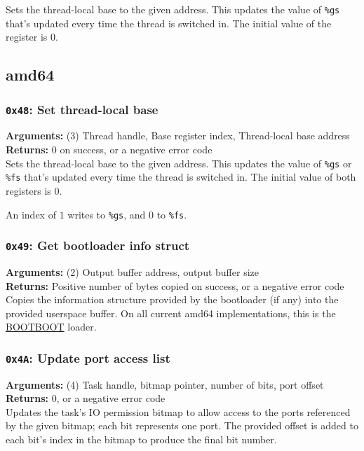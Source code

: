 \documentclass[11pt]{article}
\begin{document}
Sets the thread-local base to the given address. This updates the value of \texttt{\%gs} that's updated every time the thread is switched in. The initial value of the register is 0.

\subsection{amd64}

\subsubsection{{\tt 0x48}: Set thread-local base}
\textbf{Arguments:} (3) Thread handle, Base register index, Thread-local base address \\
\textbf{Returns:} 0 on success, or a negative error code \\

Sets the thread-local base to the given address. This updates the value of \texttt{\%gs} or \texttt{\%fs} that's updated every time the thread is switched in. The initial value of both registers is 0.

An index of $1$ writes to \texttt{\%gs}, and $0$ to \texttt{\%fs}.

\subsubsection{{\tt 0x49}: Get bootloader info struct}
\textbf{Arguments:} (2) Output buffer address, output buffer size \\
\textbf{Returns:} Positive number of bytes copied on success, or a negative error code \\

Copies the information structure provided by the bootloader (if any) into the provided userspace buffer. On all current amd64 implementations, this is the \href{https://gitlab.com/bztsrc/bootboot/}{BOOTBOOT} loader.

\subsubsection{{\tt 0x4A}: Update port access list}
\textbf{Arguments:} (4) Task handle, bitmap pointer, number of bits, port offset \\
\textbf{Returns:} 0, or a negative error code \\

Updates the task's IO permission bitmap to allow access to the ports referenced by the given bitmap; each bit represents one port. The provided offset is added to each bit's index in the bitmap to produce the final bit number.
\end{document}
